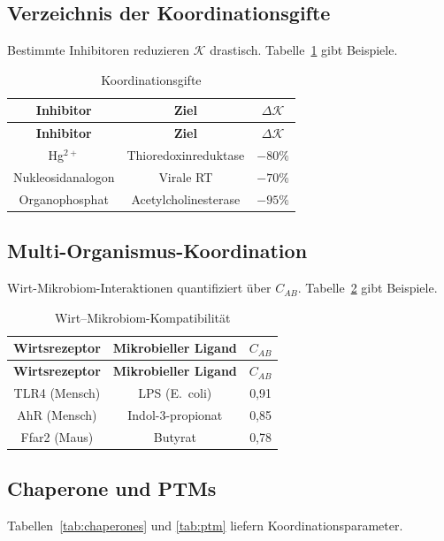 \documentclass[12pt,a4paper]{article}
\newcommand{\REL}{\mathcal{K}}          %
\begin{document}
	\subsection{Verzeichnis der Koordinationsgifte}
	Bestimmte Inhibitoren reduzieren \(\REL\) drastisch. Tabelle~\ref{tab:poisons} gibt Beispiele.
	
	\begin{longtable}{|c|c|c|}
		\caption{Koordinationsgifte}\label{tab:poisons}\\
		\hline
		\textbf{Inhibitor} & \textbf{Ziel} & \(\Delta \REL\) \\
		\hline
		\endfirsthead
		\hline
		\textbf{Inhibitor} & \textbf{Ziel} & \(\Delta \REL\) \\
		\hline
		\endhead
		\hline
		Hg\(^{2+}\) & Thioredoxinreduktase & \(-80\%\) \\
		Nukleosidanalogon & Virale RT & \(-70\%\) \\
		Organophosphat & Acetylcholinesterase & \(-95\%\) \\
		\hline
	\end{longtable}
	
	\subsection{Multi-Organismus-Koordination}
	Wirt-Mikrobiom-Interaktionen quantifiziert über \(C_{AB}\). Tabelle~\ref{tab:microbiome} gibt Beispiele.
	
	\begin{longtable}{|c|c|c|}
		\caption{Wirt–Mikrobiom-Kompatibilität}\label{tab:microbiome}\\
		\hline
		\textbf{Wirtsrezeptor} & \textbf{Mikrobieller Ligand} & \(C_{AB}\) \\
		\hline
		\endfirsthead
		\hline
		\textbf{Wirtsrezeptor} & \textbf{Mikrobieller Ligand} & \(C_{AB}\) \\
		\hline
		\endhead
		\hline
		TLR4 (Mensch) & LPS (E.\ coli) & 0,91 \\
		AhR (Mensch) & Indol-3-propionat & 0,85 \\
		Ffar2 (Maus) & Butyrat & 0,78 \\
		\hline
	\end{longtable}
	
	\subsection{Chaperone und PTMs}
	Tabellen~\ref{tab:chaperones} und \ref{tab:ptm} liefern Koordinationsparameter.
	
\end{document}
